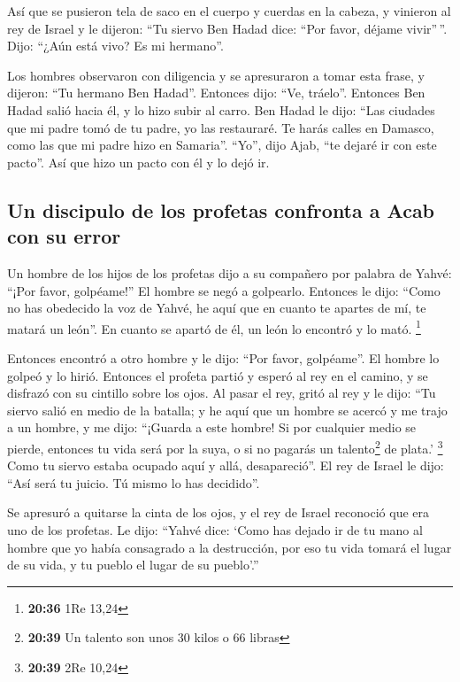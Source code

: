  Así que se pusieron tela de saco en el cuerpo y cuerdas
en la cabeza, y vinieron al rey de Israel y le dijeron: ``Tu siervo Ben
Hadad dice: ``Por favor, déjame vivir''\,''. Dijo: ``¿Aún está vivo? Es
mi hermano''.

 Los hombres observaron con diligencia y se apresuraron a
tomar esta frase, y dijeron: ``Tu hermano Ben Hadad''. Entonces dijo:
``Ve, tráelo''. Entonces Ben Hadad salió hacia él, y lo hizo subir al
carro.  Ben Hadad le dijo: ``Las ciudades que mi padre
tomó de tu padre, yo las restauraré. Te harás calles en Damasco, como
las que mi padre hizo en Samaria''. ``Yo'', dijo Ajab, ``te dejaré ir
con este pacto''. Así que hizo un pacto con él y lo dejó ir.

\hypertarget{un-discipulo-de-los-profetas-confronta-a-acab-con-su-error}{%
\subsection{Un discipulo de los profetas confronta a Acab con su
error}\label{un-discipulo-de-los-profetas-confronta-a-acab-con-su-error}}

 Un hombre de los hijos de los profetas dijo a su
compañero por palabra de Yahvé: ``¡Por favor, golpéame!'' El hombre se
negó a golpearlo.  Entonces le dijo: ``Como no has
obedecido la voz de Yahvé, he aquí que en cuanto te apartes de mí, te
matará un león''. En cuanto se apartó de él, un león lo encontró y lo
mató. \footnote{\textbf{20:36} 1Re 13,24}

 Entonces encontró a otro hombre y le dijo: ``Por favor,
golpéame''. El hombre lo golpeó y lo hirió.  Entonces el
profeta partió y esperó al rey en el camino, y se disfrazó con su
cintillo sobre los ojos.  Al pasar el rey, gritó al rey y
le dijo: ``Tu siervo salió en medio de la batalla; y he aquí que un
hombre se acercó y me trajo a un hombre, y me dijo: ``¡Guarda a este
hombre! Si por cualquier medio se pierde, entonces tu vida será por la
suya, o si no pagarás un talento\footnote{\textbf{20:39} Un talento son
  unos 30 kilos o 66 libras} de plata.' \footnote{\textbf{20:39} 2Re
  10,24}  Como tu siervo estaba ocupado aquí y allá,
desapareció''. El rey de Israel le dijo: ``Así será tu juicio. Tú mismo
lo has decidido''.

 Se apresuró a quitarse la cinta de los ojos, y el rey de
Israel reconoció que era uno de los profetas.  Le dijo:
``Yahvé dice: `Como has dejado ir de tu mano al hombre que yo había
consagrado a la destrucción, por eso tu vida tomará el lugar de su vida,
y tu pueblo el lugar de su pueblo'.''

